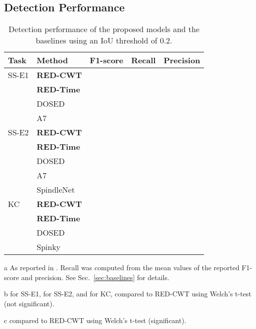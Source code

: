 \documentclass[conference]{IEEEtran}
\begin{document}
\subsection{Detection Performance}
\label{sec:result_performance}

\begin{table}[tbp]
\centering
\begin{threeparttable}
\caption{Detection performance of the proposed models and the baselines using an IoU threshold of 0.2.}
\label{tab:performance}
\begin{tabular}{lllll}
    \toprule
    Task & Method & F1-score & Recall & Precision \\
    \midrule
    SS-E1 & \textbf{RED-CWT} &
     &  & \\
    & \textbf{RED-Time} &
     \tnote{b} &  & \\
    & DOSED \cite{chambon2019dosed} &
     \tnote{c} &  &  \\
    & A7 \cite{lacourse2019sleep} &
     \tnote{c} &  &  \\
    \midrule
    SS-E2 & \textbf{RED-CWT} &
     &  & \\
    & \textbf{RED-Time} &
     \tnote{b} &  & \\
    & DOSED \cite{chambon2019dosed} &
     \tnote{c} &  & \\
    & A7 \cite{lacourse2019sleep} &
     \tnote{c} &  & \\
    & SpindleNet \cite{kulkarni2019deep} \tnote{a} &
    & \hspace{21pt} &  \\
    \midrule
    KC & \textbf{RED-CWT} &
     &  & \\
    & \textbf{RED-Time} &
     \tnote{b} &  & \\
    & DOSED \cite{chambon2019dosed} &
     \tnote{c} &  & \\
    & Spinky \cite{lajnef2017meet} &
     \tnote{c} &  & \\
    \bottomrule
\end{tabular}
 \begin{tablenotes}
\footnotesize
\item[a]{As reported in \cite{kulkarni2019deep}. Recall was computed from the mean values of the reported F1-score and precision. See Sec.~\ref{sec:baselines} for details.}
\item[b]{ for SS-E1,  for SS-E2, and  for KC, compared to RED-CWT using Welch's t-test (not significant).}
\item[c]{ compared to RED-CWT using Welch's t-test (significant).}
\end{tablenotes}
\end{threeparttable}
\end{table}
\end{document}
